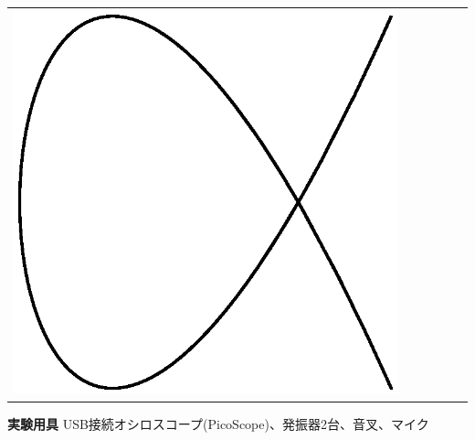 \begin{center}
\begin{tabular}{c|ccccc}
\includegraphics[scale=0.2]{05_Oscilloscope/4-5.eps} \\
\end{tabular}
\end{center}

\newpage

\jikken

\begin{itemsquarebox}[c]{\bf 実験用具}
USB接続オシロスコープ(PicoScope)、発振器2台、音叉、マイク
\end{itemsquarebox}

\bigskip


